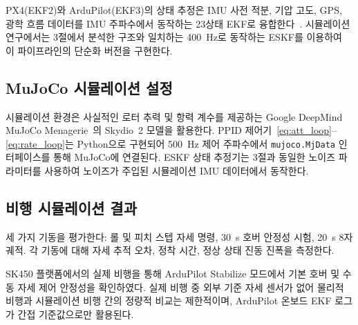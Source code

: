 PX4(EKF2)와 ArduPilot(EKF3)의 상태 추정은 IMU 사전 적분, 기압 고도,
GPS, 광학 흐름 데이터를 IMU 주파수에서 동작하는 23상태 EKF로 융합한다~\cite{px4docs}.
시뮬레이션 연구에서는 3절에서 분석한 구조와 일치하는
\SI{400}{\hertz}로 동작하는 ESKF를 이용하여 이 파이프라인의 단순화 버전을 구현한다.

\subsection{MuJoCo 시뮬레이션 설정}

시뮬레이션 환경은 사실적인 로터 추력 및 항력 계수를 제공하는
Google DeepMind MuJoCo Menagerie~\cite{deepmind2022}의 Skydio~2 모델을 활용한다.
PPID 제어기~\eqref{eq:att_loop}--\eqref{eq:rate_loop}는 Python으로 구현되어
\SI{500}{\hertz} 제어 주파수에서 \texttt{mujoco.MjData} 인터페이스를 통해 MuJoCo에 연결된다.
ESKF 상태 추정기는 3절과 동일한 노이즈 파라미터를 사용하여
노이즈가 주입된 시뮬레이션 IMU 데이터에서 동작한다.

\subsection{비행 시뮬레이션 결과}

세 가지 기동을 평가한다: 롤 및 피치 스텝 자세 명령,
\SI{30}{\second} 호버 안정성 시험, \SI{20}{\second} 8자 궤적.
각 기동에 대해 자세 추적 오차, 정착 시간, 정상 상태 진동 진폭을 측정한다.


SK450 플랫폼에서의 실제 비행을 통해 ArduPilot Stabilize 모드에서
기본 호버 및 수동 자세 제어 안정성을 확인하였다.
실제 비행 중 외부 기준 자세 센서가 없어 물리적 비행과 시뮬레이션 비행 간의
정량적 비교는 제한적이며, ArduPilot 온보드 EKF 로그가 간접 기준값으로만 활용된다.
